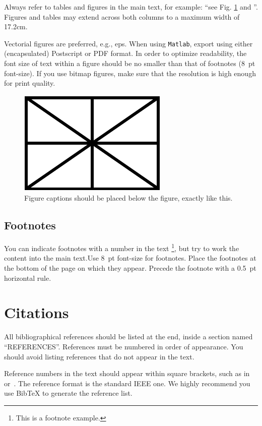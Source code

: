 \documentclass{article}
\begin{document}
Always refer to tables and figures in the main text, for example: ``see Fig. \ref{fig:example} and ''.
Figures and tables may extend across both columns to a maximum width of 17.2cm.

Vectorial figures are preferred, e.g., eps. When using \texttt{Matlab}, export using either (encapsulated) Postscript or PDF format. In order to optimize readability, the font size of text within a figure should be no smaller than
that of footnotes (8~pt font-size). If you use bitmap figures, make sure that the resolution is high enough for print quality.

\begin{figure}[t]
\centering
\includegraphics[width=0.6\columnwidth]{figure}
\caption{Figure captions should be placed below the figure,
exactly like this.\label{fig:example}}
\end{figure}


\subsection{Footnotes}
You can indicate footnotes with a number in the text \footnote{This is a footnote example.},
but try to work the content into the main text.Use 8~pt font-size for footnotes.  Place the footnotes at the bottom of the page
on which they appear. Precede the footnote with a 0.5~pt horizontal rule.

\section{Citations}
All bibliographical references should be listed at the end, inside a section named ``REFERENCES''. References must be numbered in order of appearance. You should avoid listing references that do not appear in the text.

Reference numbers in the text should appear within square brackets, such as in~\cite{Someone:00} or~\cite{Someone:00,Someone:04,Someone:09}. The reference format is the standard IEEE one. We highly recommend you use BibTeX
to generate the reference list.
\end{document}
